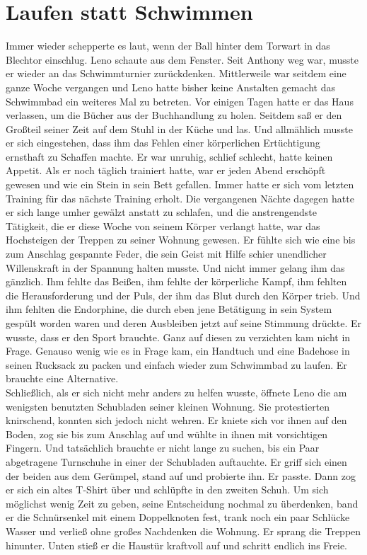 \documentclass[ngerman,smalldemyvopaper,11pt,oneside,onecolumn,openright,extrafontsizes]{memoir}
\begin{document}
\chapter{Laufen statt Schwimmen}
Immer wieder schepperte es laut, wenn der Ball hinter dem Torwart in das Blechtor einschlug. Leno schaute aus dem Fenster. Seit Anthony weg war, musste er wieder an das Schwimmturnier zurückdenken. Mittlerweile war seitdem eine ganze Woche vergangen und Leno hatte bisher keine Anstalten gemacht das Schwimmbad ein weiteres Mal zu betreten. Vor einigen Tagen hatte er das Haus verlassen, um die Bücher aus der Buchhandlung zu holen. Seitdem saß er den Großteil seiner Zeit auf dem Stuhl in der Küche und las. Und allmählich musste er sich eingestehen, dass ihm das Fehlen einer körperlichen Ertüchtigung ernsthaft zu Schaffen machte. Er war unruhig, schlief schlecht, hatte keinen Appetit. Als er noch täglich trainiert hatte, war er jeden Abend erschöpft gewesen und wie ein Stein in sein Bett gefallen. Immer hatte er sich vom letzten Training für das nächste Training erholt. Die vergangenen Nächte dagegen hatte er sich lange umher gewälzt anstatt zu schlafen, und die anstrengendste Tätigkeit, die er diese Woche von seinem Körper verlangt hatte, war das Hochsteigen der Treppen zu seiner Wohnung gewesen. Er fühlte sich wie eine bis zum Anschlag gespannte Feder, die sein Geist mit Hilfe schier unendlicher Willenskraft in der Spannung halten musste. Und nicht immer gelang ihm das gänzlich. Ihm fehlte das Beißen, ihm fehlte der körperliche Kampf, ihm fehlten die Herausforderung und der Puls, der ihm das Blut durch den Körper trieb. Und ihm fehlten die Endorphine, die durch eben jene Betätigung in sein System gespült worden waren und deren Ausbleiben jetzt auf seine Stimmung drückte. Er wusste, dass er den Sport brauchte. Ganz auf diesen zu verzichten kam nicht in Frage. Genauso wenig wie es in Frage kam, ein Handtuch und eine Badehose in seinen Rucksack zu packen und einfach wieder zum Schwimmbad zu laufen. Er brauchte eine Alternative.
\vspace{0.5em} \\
Schließlich, als er sich nicht mehr anders zu helfen wusste, öffnete Leno die am wenigsten benutzten Schubladen seiner kleinen Wohnung. Sie protestierten knirschend, konnten sich jedoch nicht wehren. Er kniete sich vor ihnen auf den Boden, zog sie bis zum Anschlag auf und wühlte in ihnen mit vorsichtigen Fingern. Und tatsächlich brauchte er nicht lange zu suchen, bis ein Paar abgetragene Turnschuhe in einer der Schubladen auftauchte. Er griff sich einen der beiden aus dem Gerümpel, stand auf und probierte ihn. Er passte. Dann zog er sich ein altes T-Shirt über und schlüpfte in den zweiten Schuh. Um sich möglichst wenig Zeit zu geben, seine Entscheidung nochmal zu überdenken, band er die Schnürsenkel mit einem Doppelknoten fest, trank noch ein paar Schlücke Wasser und verließ ohne großes Nachdenken die Wohnung. Er sprang die Treppen hinunter. Unten stieß er die Haustür kraftvoll auf und schritt endlich ins Freie.\\
\end{document}
